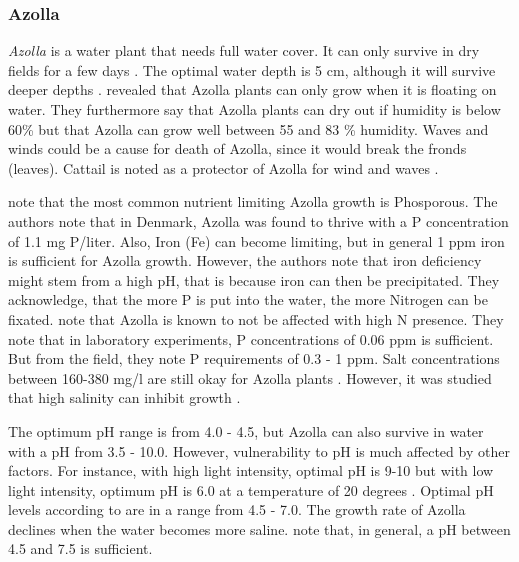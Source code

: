 \documentclass[12pt,a4paper,titlepage]{article}
\begin{document}
\subsubsection{Azolla}

\textit{Azolla} is a water plant that needs full water cover. It can only survive in dry fields for a few days \citep{wagner1997azolla}. The optimal water depth is 5 cm, although it will survive deeper depths \citep{wagner1997azolla}. \citet{sabetraftar2013review} revealed that Azolla plants can only grow when it is floating on water. They furthermore say that Azolla plants can dry out if humidity is below 60\% but that Azolla can grow well between 55 and 83 \% humidity.  Waves and winds could be a cause for death of Azolla, since it would break the fronds (leaves). Cattail is noted as a protector of Azolla for wind and waves \citep{sabetraftar2013review}.  

\citet{lumpkin1980azolla} note that the most common nutrient limiting Azolla growth is Phosporous. The authors note that in Denmark, Azolla was found to thrive with a P concentration of 1.1 mg P/liter. Also, Iron (Fe) can become limiting, but in general 1 ppm iron is  sufficient for Azolla growth. However, the authors note that iron deficiency might stem from a high pH, that is because iron can then be precipitated. They acknowledge, that the more P is put into the water, the more Nitrogen can be fixated. \citet{sabetraftar2013review} note that Azolla is known to not be affected with high N presence. They note that in laboratory experiments, P concentrations of 0.06 ppm  is sufficient. But from the field, they note P requirements of 0.3 - 1 ppm. Salt concentrations between 160-380 mg/l are still okay for Azolla plants \citep{lumpkin1980azolla}. However, it was studied that high salinity can inhibit growth \citep{sabetraftar2013review, lumpkin1980azolla}. 

The optimum pH range is from 4.0 - 4.5, but Azolla can also survive in water with a pH from 3.5 - 10.0. However, vulnerability to pH is much affected by other factors. For instance, with high light intensity, optimal pH is 9-10 but with low light intensity, optimum pH is 6.0 at a temperature of 20 degrees \citep{wagner1997azolla}. Optimal pH levels according to \citet{lumpkin1980azolla} are in a range from 4.5 - 7.0. The growth rate of Azolla declines when the water becomes more saline. \citet{sabetraftar2013review} note that, in general, a pH between 4.5 and 7.5 is sufficient.
\end{document}
